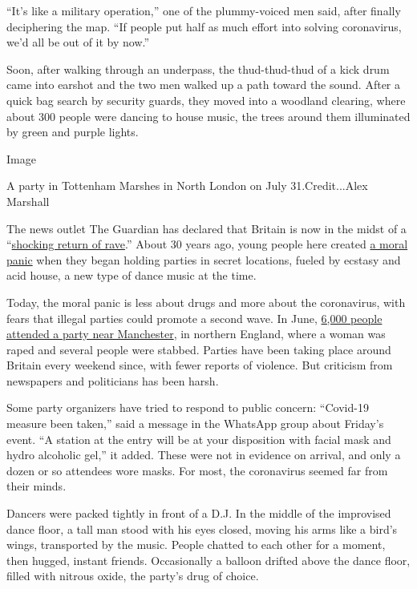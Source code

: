 ``It's like a military operation,'' one of the plummy-voiced men said,
after finally deciphering the map. ``If people put half as much effort
into solving coronavirus, we'd all be out of it by now.''

Soon, after walking through an underpass, the thud-thud-thud of a kick
drum came into earshot and the two men walked up a path toward the
sound. After a quick bag search by security guards, they moved into a
woodland clearing, where about 300 people were dancing to house music,
the trees around them illuminated by green and purple lights.

Image

A party in Tottenham Marshes in North London on July 31.Credit...Alex
Marshall

The news outlet The Guardian has declared that Britain is now in the
midst of a
``\href{https://www.theguardian.com/music/2020/jun/30/off-their-heads-the-shocking-return-of-the-rave}{shocking
return of rave}.'' About 30 years ago, young people here created
\href{https://www.nytimes3xbfgragh.onion/2018/09/10/arts/music/1988-acid-house-summer-of-love-oakenfold.html}{a
moral panic} when they began holding parties in secret locations, fueled
by ecstasy and acid house, a new type of dance music at the time.

Today, the moral panic is less about drugs and more about the
coronavirus, with fears that illegal parties could promote a second
wave. In June,
\href{https://www.bbc.co.uk/news/uk-england-manchester-53062837}{6,000
people attended a party near Manchester}, in northern England, where a
woman was raped and several people were stabbed. Parties have been
taking place around Britain every weekend since, with fewer reports of
violence. But criticism from newspapers and politicians has been harsh.

Some party organizers have tried to respond to public concern:
``Covid-19 measure been taken,'' said a message in the WhatsApp group
about Friday's event. ``A station at the entry will be at your
disposition with facial mask and hydro alcoholic gel,'' it added. These
were not in evidence on arrival, and only a dozen or so attendees wore
masks. For most, the coronavirus seemed far from their minds.

Dancers were packed tightly in front of a D.J. In the middle of the
improvised dance floor, a tall man stood with his eyes closed, moving
his arms like a bird's wings, transported by the music. People chatted
to each other for a moment, then hugged, instant friends. Occasionally a
balloon drifted above the dance floor, filled with nitrous oxide, the
party's drug of choice.

